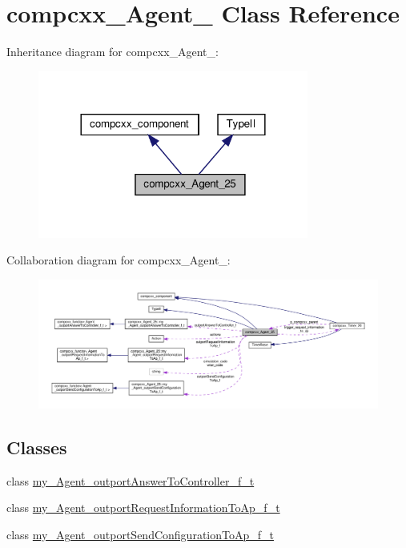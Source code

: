 \hypertarget{classcompcxx__Agent__25}{}\section{compcxx\+\_\+\+Agent\+\_ Class Reference}
\label{classcompcxx__Agent__25}


Inheritance diagram for compcxx\+\_\+\+Agent\+\_\+:\nopagebreak
\begin{figure}[H]
\begin{center}
\leavevmode
\includegraphics[width=252pt]{classcompcxx__Agent__25__inherit__graph}
\end{center}
\end{figure}


Collaboration diagram for compcxx\+\_\+\+Agent\+\_\+:\nopagebreak
\begin{figure}[H]
\begin{center}
\leavevmode
\includegraphics[width=350pt]{classcompcxx__Agent__25__coll__graph}
\end{center}
\end{figure}
\subsection*{Classes}
\begin{DoxyCompactItemize}
\item 
class \hyperlink{classcompcxx__Agent__25_1_1my__Agent__outportAnswerToController__f__t}{my\+\_\+\+Agent\+\_\+outport\+Answer\+To\+Controller\+\_\+f\+\_\+t}
\item 
class \hyperlink{classcompcxx__Agent__25_1_1my__Agent__outportRequestInformationToAp__f__t}{my\+\_\+\+Agent\+\_\+outport\+Request\+Information\+To\+Ap\+\_\+f\+\_\+t}
\item 
class \hyperlink{classcompcxx__Agent__25_1_1my__Agent__outportSendConfigurationToAp__f__t}{my\+\_\+\+Agent\+\_\+outport\+Send\+Configuration\+To\+Ap\+\_\+f\+\_\+t}
\end{DoxyCompactItemize}
